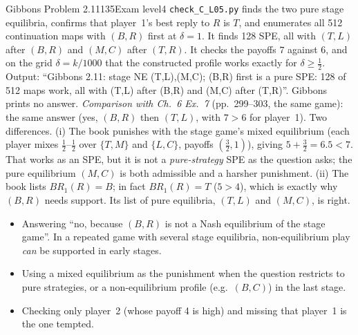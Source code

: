 \begin{exsol}{Gibbons Problem 2.11}{135}{Exam level}{4}
\verify \texttt{check\_C\_L05.py} finds the two pure stage equilibria, confirms that player~1's best
reply to $R$ is $T$, and enumerates all 512 continuation maps with $(B,R)$ first at $\delta = 1$. It
finds 128 SPE, all with $(T,L)$ after $(B,R)$ and $(M,C)$ after $(T,R)$. It checks the payoffs
$7$ against $6$, and on the grid $\delta = k/1000$ that the constructed profile works exactly for
$\delta \ge \frac12$. Output: ``Gibbons 2.11: stage NE (T,L),(M,C); (B,R) first is a pure SPE: 128 of
512 maps work, all with (T,L) after (B,R) and (M,C) after (T,R)''. Gibbons prints no answer.
\emph{Comparison with \MG{} Ch.~6 Ex.~7} (pp.~299--303, the same game): the same answer (yes, $(B,R)$
then $(T,L)$, with $7 > 6$ for player~1). Two differences. (i) The book punishes with the stage game's
mixed equilibrium (each player mixes $\frac12$--$\frac12$ over $\{T,M\}$ and $\{L,C\}$, payoffs
$(\frac32, 1)$), giving $5 + \frac32 = 6.5 < 7$. That works as an SPE, but it is not a
\emph{pure-strategy} SPE as the question asks; the pure equilibrium $(M,C)$ is both admissible and a
harsher punishment. (ii) The book lists $BR_1(R) = B$; in fact $BR_1(R) = T$ ($5 > 4$), which is
exactly why $(B,R)$ needs support. Its list of pure equilibria, $(T,L)$ and $(M,C)$, is right.

\mistakes
\begin{itemize}
  \item Answering ``no, because $(B,R)$ is not a Nash equilibrium of the stage game''. In a repeated
  game with several stage equilibria, non-equilibrium play \emph{can} be supported in early stages.
  \item Using a mixed equilibrium as the punishment when the question restricts to pure strategies,
  or a non-equilibrium profile (e.g.\ $(B,C)$) in the last stage.
  \item Checking only player~2 (whose payoff 4 is high) and missing that player~1 is the one tempted.
\end{itemize}

\end{exsol}
